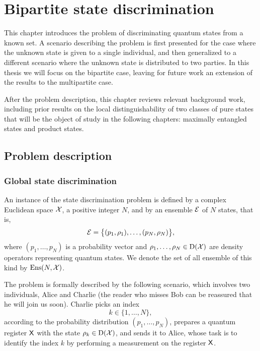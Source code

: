 \chapter{Bipartite state discrimination}
\label{chap:bipartite-state-discrimination}

This chapter introduces the problem of discriminating quantum states
from a known set.
A scenario describing the problem is first presented for the case where the 
unknown state is given to a single individual, and then generalized to a 
different scenario where the unknown state is distributed to two parties.
In this thesis we will focus on the bipartite case, leaving for future work 
an extension of the results to the multipartite case.

After the problem description, this chapter reviews relevant background work,
including prior results on the local distinguishability of
two classes of pure states that will be the object of study in the following 
chapters: maximally entangled states and product states.

\minitoc

\section{Problem description}

\subsection*{Global state discrimination}
An instance of the state discrimination problem is defined by a complex 
Euclidean space $\mathcal{X}$, a positive integer $N$, and by an ensemble $\mathcal{E}$ of $N$ 
states, that is,
\begin{equation}
\label{eq:global-ensemble}
  \mathcal{E} = \big\{ (p_{1}, \rho_{1}), \ldots, (p_{N}, \rho_{N}) \big\},
\end{equation}
where $(p_{1}, \ldots, p_{N})$ is a probability vector 
and $\rho_{1}, \ldots, \rho_{N} \in \mathrm{D}(\mathcal{X})$ are density operators representing
quantum states.
We denote the set of all ensemble of this kind by $\mathrm{Ens}(N, \mathcal{X})$.

The problem is formally described by the following 
scenario, which involves two individuals, Alice and Charlie (the reader who misses
Bob can be reassured that he will join us soon).
Charlie picks an index 
\[
  k \in \{1, \ldots, N \},
\] 
according to the probability distribution $(p_{1}, \ldots, p_{N})$, 
prepares a quantum register $\mathsf{X}$ with the state $\rho_{k} \in \mathrm{D}(\mathcal{X})$,
and sends it to Alice, whose task is to identify the index $k$ by performing a measurement on the 
register $\mathsf{X}$.

